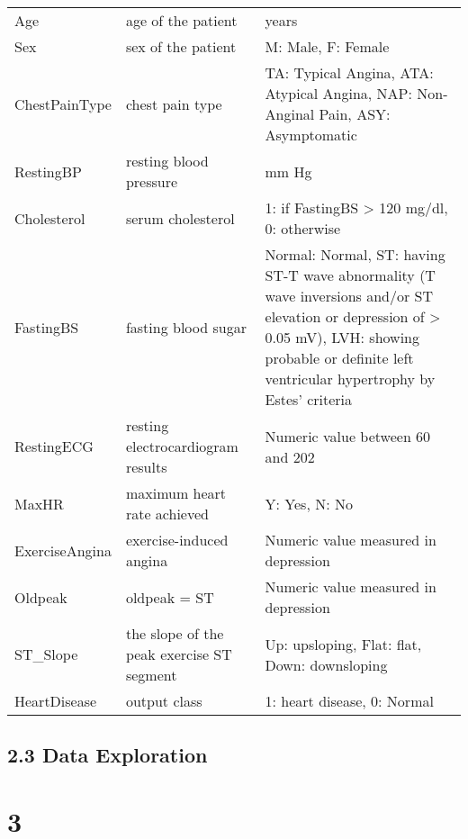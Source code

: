 \documentclass[
]{article}
\begin{document}
\begin{table}
\centering
\begin{tabular}{|l|l|l|}
\hline
Age&age of the patient &years\\ 
Sex&sex of the patient&M: Male, F: Female\\ 
ChestPainType&chest pain type&TA: Typical Angina, ATA: Atypical Angina, NAP: Non-Anginal Pain, ASY: Asymptomatic\\ 
RestingBP&resting blood pressure &mm Hg\\ 
Cholesterol&serum cholesterol&1: if FastingBS > 120 mg/dl, 0: otherwise\\ 
FastingBS&fasting blood sugar&Normal: Normal, ST: having ST-T wave abnormality (T wave inversions and/or ST elevation or depression of > 0.05 mV), LVH: showing probable or definite left ventricular hypertrophy by Estes' criteria\\ 
RestingECG&resting electrocardiogram results&Numeric value between 60 and 202\\ 
MaxHR&maximum heart rate achieved&Y: Yes, N: No\\ 
ExerciseAngina& exercise-induced angina &Numeric value measured in depression\\ 
Oldpeak&oldpeak = ST &Numeric value measured in depression\\ 
ST_Slope&the slope of the peak exercise ST segment &Up: upsloping, Flat: flat, Down: downsloping\\ 
HeartDisease&output class&1: heart disease, 0: Normal\\ 
\hline
\end{tabular}
\end{table}

\hypertarget{data-exploration}{%
\subsection{2.3 Data Exploration}\label{data-exploration}}

\hypertarget{section}{%
\section{3}\label{section}}
\end{document}
